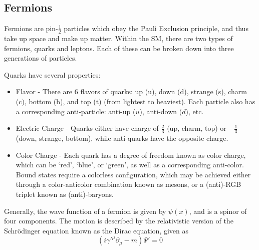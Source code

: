         \subsection{Fermions}
        Fermions are pin-$\frac{1}{2}$ particles which obey the Pauli Exclusion principle, and thus take up space and make up matter. Within the \gls{SM}, there are two types of fermions, quarks and leptons. Each of these can be broken down into three generations of particles.

        Quarks have several properties:
        \begin{itemize}
            \item Flavor - There are 6 flavors of quarks: up (u), down (d), strange (s), charm (c), bottom (b), and top (t) (from lightest to heaviest). Each particle also has a corresponding anti-particle: anti-up ($\bar{u}$), anti-down ($\bar{d}$), etc.
            \item Electric Charge - Quarks either have charge of $\frac{2}{3}$ (up, charm, top) or $-\frac{1}{3}$ (down, strange, bottom), while anti-quarks have the opposite charge. 
            \item Color Charge - Each quark has a degree of freedom known as color charge, which can be `red', `blue', or `green', as well as a corresponding anti-color. Bound states require a colorless configuration, which may be achieved either through a color-anticolor combination known as mesons, or a (anti)-RGB triplet known as (anti)-baryons.
        \end{itemize}


        Generally, the wave function of a fermion is given by $\psi(x)$, and is a spinor of four components. The motion is described by the relativistic version of the Schr{\"o}dinger equation known as the Dirac equation, given as
        \begin{equation} \label{eqn:dirac}
            (i\gamma'^{\mu}\partial_{\mu}-m)\Psi' = 0
        \end{equation}

